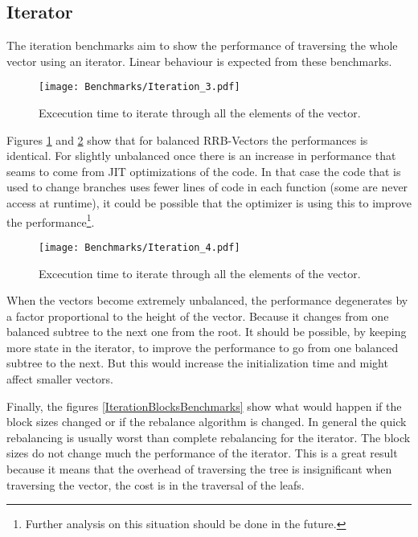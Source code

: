 \FloatBarrier

\subsection{Iterator}
The iteration benchmarks aim to show the performance of traversing the whole vector using an iterator. Linear behaviour is expected from these benchmarks.

\begin{figure}[h!]
  \centering
  \texttt{[image: Benchmarks/Iteration\_3.pdf]}
  \caption{Excecution time to iterate through all the elements of the vector.}
  \label{Iteration2Benchmarks}
\end{figure}

Figures \ref{Iteration2Benchmarks} and \ref{Iteration3Benchmarks} show that for balanced RRB-Vectors the performances is identical. For slightly unbalanced once there is an increase in performance that seams to come from JIT optimizations of the code. In that case the code that is used to change branches uses fewer lines of code in each function (some are never access at runtime), it could be possible that the optimizer is using this to improve the performance\footnote{Further analysis on this situation should be done in the future.}. 

\begin{figure}[h!]
  \centering
  \texttt{[image: Benchmarks/Iteration\_4.pdf]}
  \caption{Excecution time to iterate through all the elements of the vector.}
  \label{Iteration3Benchmarks}
\end{figure}

When the vectors become extremely unbalanced, the performance degenerates by a factor proportional to the height of the vector. Because it changes from one balanced subtree to the next one from the root. It should be possible, by keeping more state in the iterator, to improve the performance to go from one balanced subtree to the next. But this would increase the initialization time and might affect smaller vectors.

\FloatBarrier

Finally, the figures \ref{IterationBlocksBenchmarks} show what would happen if the block sizes changed or if the rebalance algorithm is changed. In general the quick rebalancing is usually worst than complete rebalancing for the iterator. The block sizes do not change much the performance of the iterator. This is a great result because it means that the overhead of traversing the tree is insignificant when traversing the vector, the cost is in the traversal of the leafs.

